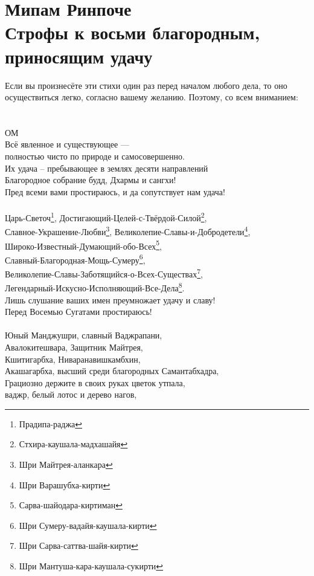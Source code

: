 \section{Мипам Ринпоче\\Строфы к восьми благородным, \\приносящим удачу}
\scriptsize
Если вы произнесёте эти стихи один раз перед началом любого дела,
то оно осуществиться легко, согласно вашему желанию. Поэтому, со всем вниманием:\\
\normalsize
\\
\\
ОМ\\
Всё явленное и существующее — \\ \indent полностью чисто по природе и самосовершенно.\\
Их удача – пребывающее в землях десяти направлений \\
Благородное собрание будд, Дхармы и сангхи!\\
Пред всеми вами простираюсь, и да сопутствует нам удача!\\
\\
Царь-Светоч\footnote{Прадипа-раджа}, Достигающий-Целей-с-Твёрдой-Силой\footnote{Стхира-каушала-мадхашайя},\\
Славное-Украшение-Любви\footnote{ Шри Майтрея-аланкара},  Великолепие-Славы-и-Добродетели\footnote{ Шри Варашубха-кирти},\\
Широко-Известный-Думающий-обо-Всех\footnote{ Сарва-шайодара-киртиман},\\
Славный-Благородная-Мощь-Сумеру\footnote{ Шри Сумеру-вадайя-каушала-кирти},\\
Великолепие-Славы-Заботящийся-о-Всех-Существах\footnote{ Шри Сарва-саттва-шайя-кирти},\\
Легендарный-Искусно-Исполняющий-Все-Дела\footnote{ Шри Мантуша-кара-каушала-сукирти}. \\
Лишь слушание ваших имен преумножает удачу и славу!\\
Перед Восемью Сугатами простираюсь!\\
\\
\newpage
Юный Манджушри, славный Ваджрапани,\\
Авалокитешвара, Защитник Майтрея,\\
Кшитигарбха, Ниваранавишкамбхин,\\
Акашагарбха, высший среди благородных Самантабхадра,\\
Грациозно держите в своих руках цветок утпала, \\
ваджр, белый лотос и дерево нагов,\\
